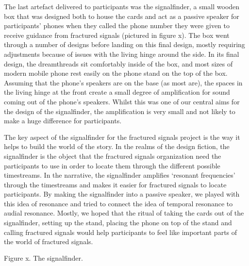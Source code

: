 The last artefact delivered to participants was the signalfinder, a small wooden box that was designed both to house the cards and act as a passive speaker for participants’ phones when they called the phone number they were given to receive guidance from fractured signals (pictured in figure x). The box went through a number of designs before landing on this final design, mostly requiring adjustments because of issues with the living hinge around the side. In its final design, the dreamthreads sit comfortably inside of the box, and most sizes of modern mobile phone rest easily on the phone stand on the top of the box. Assuming that the phone’s speakers are on the base (as most are), the spaces in the living hinge at the front create a small degree of amplification for sound coming out of the phone’s speakers. Whilst this was one of our central aims for the design of the signalfinder, the amplification is very small and not likely to make a huge difference for participants. 

The key aspect of the signalfinder for the fractured signals project is the way it helps to build the world of the story. In the realms of the design fiction, the signalfinder is the object that the fractured signals organization need the participants to use in order to locate them through the different possible timestreams. In the narrative, the signalfinder amplifies ‘resonant frequencies’ through the timestreams and makes it easier for fractured signals to locate participants. By making the signalfinder into a passive speaker, we played with this idea of resonance and tried to connect the idea of temporal resonance to audial resonance. Mostly, we hoped that the ritual of taking the cards out of the signalfinder, setting up the stand, placing the phone on top of the stand and calling fractured signals would help participants to feel like important parts of the world of fractured signals. 

Figure x. The signalfinder.

